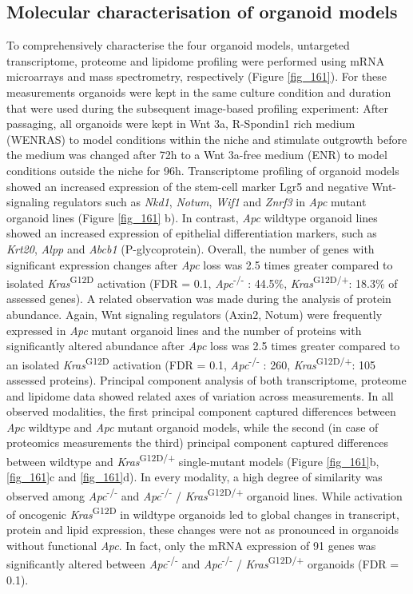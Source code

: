 \begin{flushleft}
\subsection{Molecular characterisation of organoid models}
To comprehensively characterise the four organoid models, untargeted transcriptome, proteome and lipidome profiling were performed using mRNA microarrays and mass spectrometry, respectively (Figure \ref{fig_161}). For these measurements organoids were kept in the same culture condition and duration that were used during the subsequent image-based profiling experiment: After passaging, all organoids were kept in Wnt 3a, R-Spondin1 rich medium (WENRAS) to model conditions within the niche and stimulate outgrowth before the medium was changed after 72h to a Wnt 3a-free medium (ENR) to model conditions outside the niche for 96h. Transcriptome profiling of organoid models showed an increased expression of the stem-cell marker Lgr5 and negative Wnt-signaling regulators such as \textit{Nkd1}, \textit{Notum}, \textit{Wif1} and \textit{Znrf3} in \textit{Apc} mutant organoid lines (Figure \ref{fig_161} b). In contrast, \textit{Apc} wildtype organoid lines showed an increased expression of epithelial differentiation markers, such as \textit{Krt20}, \textit{Alpp} and \textit{Abcb1} (P-glycoprotein). Overall, the number of genes with significant expression changes after \textit{Apc} loss was 2.5 times greater compared to isolated \textit{Kras}\textsuperscript{G12D} activation (FDR = 0.1, \textit{Apc}\textsuperscript{-/-} : 44.5\%, \textit{Kras}\textsuperscript{G12D/+}: 18.3\% of assessed genes). A related observation was made during the analysis of protein abundance. Again, Wnt signaling regulators (Axin2, Notum) were frequently expressed in \textit{Apc} mutant organoid lines and the number of proteins with significantly altered abundance after \textit{Apc} loss was 2.5 times greater compared to an isolated \textit{Kras}\textsuperscript{G12D} activation (FDR = 0.1, \textit{Apc}\textsuperscript{-/-} : 260, \textit{Kras}\textsuperscript{G12D/+}: 105 assessed proteins). Principal component analysis of both transcriptome, proteome and lipidome data showed related axes of variation across measurements. In all observed modalities, the first principal component captured differences between \textit{Apc} wildtype and \textit{Apc} mutant organoid models, while the second (in case of proteomics measurements the third) principal component captured differences between wildtype and \textit{Kras}\textsuperscript{G12D/+} single-mutant models (Figure \ref{fig_161}b, \ref{fig_161}c and \ref{fig_161}d). In every modality, a high degree of similarity was observed among \textit{Apc}\textsuperscript{-/-}  and \textit{Apc}\textsuperscript{-/-} / \textit{Kras}\textsuperscript{G12D/+} organoid lines. While activation of oncogenic \textit{Kras}\textsuperscript{G12D} in wildtype organoids led to global changes in transcript, protein and lipid expression, these changes were not as pronounced in organoids without functional \textit{Apc}. In fact, only the mRNA expression of 91 genes was significantly altered between \textit{Apc}\textsuperscript{-/-}  and \textit{Apc}\textsuperscript{-/-} / \textit{Kras}\textsuperscript{G12D/+} organoids (FDR = 0.1). 


\end{flushleft}

